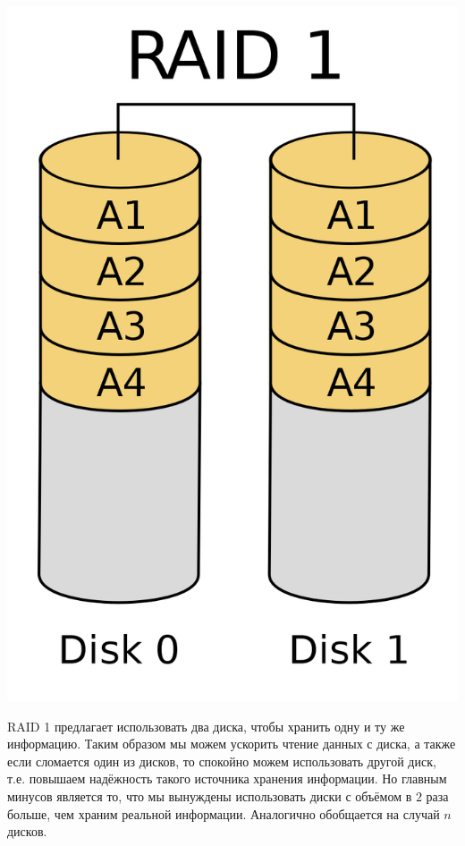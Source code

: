 \documentclass[12pt, a4paper]{article}
\begin{document}
\begin{center}
\includegraphics[scale=0.1]{./images/RAID1.png}
\end{center}

RAID 1 предлагает использовать два диска, чтобы хранить одну и ту же информацию. Таким образом мы можем ускорить чтение данных с диска, а также если сломается один из дисков, то спокойно можем использовать другой диск, т.е. повышаем надёжность такого источника хранения информации. Но главным минусов является то, что мы вынуждены использовать диски с объёмом в $2$ раза больше, чем храним реальной информации. Аналогично обобщается на случай $n$ дисков.
\end{document}
